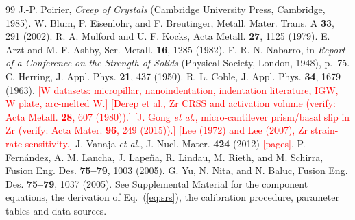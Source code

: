 \documentclass[aps,prl,twocolumn,superscriptaddress,amsmath,amssymb,floatfix]{revtex4-2}
\newcommand{\todo}[1]{\textcolor{red}{[#1]}}
\begin{document}
\begin{thebibliography}{99}
 J.-P. Poirier, \emph{Creep of Crystals} (Cambridge University Press, Cambridge, 1985).
 W. Blum, P. Eisenlohr, and F. Breutinger, Metall. Mater. Trans. A \textbf{33}, 291 (2002).
 R. A. Mulford and U. F. Kocks, Acta Metall. \textbf{27}, 1125 (1979).
 E. Arzt and M. F. Ashby, Scr. Metall. \textbf{16}, 1285 (1982).
 F. R. N. Nabarro, in \emph{Report of a Conference on the Strength of Solids} (Physical Society, London, 1948), p.~75.
 C. Herring, J. Appl. Phys. \textbf{21}, 437 (1950).
 R. L. Coble, J. Appl. Phys. \textbf{34}, 1679 (1963).
 \todo{W datasets: micropillar, nanoindentation, indentation literature, IGW, W plate, arc-melted W.}
 \todo{Derep et al., Zr CRSS and activation volume (verify: Acta Metall. \textbf{28}, 607 (1980)).}
 \todo{J. Gong \emph{et al.}, micro-cantilever prism/basal slip in Zr (verify: Acta Mater. \textbf{96}, 249 (2015)).}
 \todo{Lee (1972) and Lee (2007), Zr strain-rate sensitivity.}
 J. Vanaja \emph{et al.}, J. Nucl. Mater. \textbf{424} (2012) \todo{pages}.
 P. Fern\'andez, A. M. Lancha, J. Lape\~na, R. Lindau, M. Rieth, and M. Schirra, Fusion Eng. Des. \textbf{75--79}, 1003 (2005).
 G. Yu, N. Nita, and N. Baluc, Fusion Eng. Des. \textbf{75--79}, 1037 (2005).
 See Supplemental Material for the component equations, the derivation of Eq.~(\ref{eq:srs}), the calibration procedure, parameter tables and data sources.
\end{thebibliography}
\end{document}
